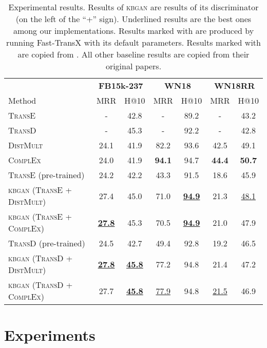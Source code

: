 \documentclass[11pt,a4paper]{article}
\begin{document}
\begin{table*}[t]
\centering
\begin{tabular}{|l|cc|cc|cc|}
\hline
             & \multicolumn{2}{c}{\bf FB15k-237} \vline & \multicolumn{2}{c}{\bf WN18} \vline & \multicolumn{2}{c}{\bf WN18RR}\vline \\
Method                         & MRR         & H@10   & MRR         & H@10 & MRR & H@10\\
\hline
\textsc{TransE}    & - & 42.8 & - & 89.2 & -    & 43.2 \\
\textsc{TransD}    & - & 45.3 & - & 92.2 & -    & 42.8 \\ 
\textsc{DistMult}  & 24.1  & 41.9 & 82.2 & 93.6 & 42.5 & 49.1 \\
\textsc{ComplEx}   & 24.0  & 41.9 & \textbf{94.1} & 94.7 & \textbf{44.4} & \textbf{50.7} \\
\hline
\textsc{TransE} (pre-trained)                         & 24.2    & 42.2  & 43.3   & 91.5 & 18.6 & 45.9 \\
\textsc{kbgan} (\textsc{TransE} + \textsc{DistMult})  & 27.4  & 45.0 & 71.0 & \textbf{\underline{94.9}} & 21.3 & \underline{48.1} \\
\textsc{kbgan} (\textsc{TransE} + \textsc{ComplEx})   & \textbf{\underline{27.8}} & 45.3 & 70.5  & \textbf{\underline{94.9}} & 21.0 & 47.9 \\
\textsc{TransD} (pre-trained)                         & 24.5 & 42.7 & 49.4  & 92.8 & 19.2 & 46.5 \\
\textsc{kbgan} (\textsc{TransD} + \textsc{DistMult})  & \textbf{\underline{27.8}} & \textbf{\underline{45.8}} & 77.2 & 94.8 & 21.4 & 47.2\\
\textsc{kbgan} (\textsc{TransD} + \textsc{ComplEx})   & 27.7 & \textbf{\underline{45.8}} & \underline{77.9} & 94.8 & \underline{21.5} & 46.9\\ \hline
\end{tabular}
\caption{Experimental results. Results of \textsc{kbgan} are results of its discriminator (on the left of the ``+'' sign). Underlined results are the best ones among our implementations. Results marked with  are produced by running Fast-TransX \cite{lin2015learning} with its default parameters. Results marked with  are copied from \cite{conve}. All other baseline results are copied from their original papers.}
\label{tab:results}
\end{table*}

\section{Experiments}
\end{document}
